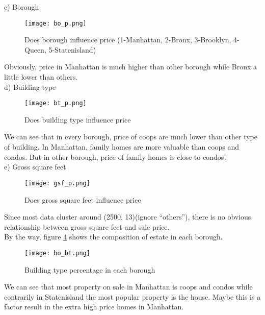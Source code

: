 \documentclass{article}
\begin{document}
\noindent c) Borough \\
\begin{figure}[H] 
\begin{center} 
\texttt{[image: bo\_p.png]}  
\caption{Does borough influence price (1-Manhattan, 2-Bronx, 3-Brooklyn, 4-Queen, 5-Statenisland)} 
\label{bo_p} 
\end{center} 
\end{figure}
Obviously, price in Manhattan is much higher than other borough while Bronx a little lower than others.\\

\noindent d) Building type \\
\begin{figure}[H] 
\begin{center} 
\texttt{[image: bt\_p.png]}  
\caption{Does building type influence price} 
\label{bt_p} 
\end{center} 
\end{figure}
We can see that in every borough, price of coops are much lower than other type of building. In Manhattan, family homes are more valuable than coops and condos. But in other borough, price of family homes is close to condos'. \\

\noindent e) Gross square feet \\
\begin{figure}[H] 
\begin{center} 
\texttt{[image: gsf\_p.png]}  
\caption{Does gross square feet influence price} 
\label{bo_bt} 
\end{center} 
\end{figure}
Since most data cluster around (2500, 13)(ignore ``others''), there is no obvious relationship between gross square feet and sale price.\\

\noindent By the way, figure \ref{bo_bt} shows the composition of estate in each borough. \\
\begin{figure}[H] 
\begin{center} 
\texttt{[image: bo\_bt.png]}  
\caption{Building type percentage in each borough} 
\label{bo_bt} 
\end{center} 
\end{figure}
We can see that most property on sale in Manhattan is coops and condos while contrarily in Statenisland the most popular property is the house. Maybe this is a factor result in the extra high price homes in Manhattan.\\
\end{document}
